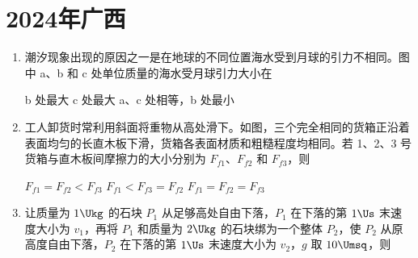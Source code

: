 \documentclass[\gkver]{gaokaozhenti}
\begin{document}
\chapter{2024年广西}

\begin{enumerate}
\item
潮汐现象出现的原因之一是在地球的不同位置海水受到月球的引力不相同。图中 a、b 和 c 处单位质量的海水受月球引力大小在


{b 处最大}
{c 处最大}
{a、c 处相等，b 处最小}


\item
工人卸货时常利用斜面将重物从高处滑下。如图，三个完全相同的货箱正沿着表面均匀的长直木板下滑，货箱各表面材质和粗糙程度均相同。若 1、2、3 号货箱与直木板间摩擦力的大小分别为 $F_{f1}$、$F_{f2}$ 和 $F_{f3}$，则


{$F_{f1} = F_{f2} < F_{f3}$}
{$F_{f1} < F_{f3} = F_{f2}$}
{$F_{f1} = F_{f2} = F_{f3}$}


\item
让质量为 $1 \Ukg$ 的石块 $P_{1}$ 从足够高处自由下落，$P_{1}$ 在下落的第 $1 \Us$ 末速度大小为 $v_{1}$，再将 $P_{1}$ 和质量为 $2 \Ukg$ 的石块绑为一个整体 $P_{2}$，使 $P_{2}$ 从原高度自由下落，$P_{2}$ 在下落的第 $1 \Us$ 末速度大小为 $v_{2}$，$g$ 取 $10 \Umsq$，则


\end{enumerate}
\end{document}
